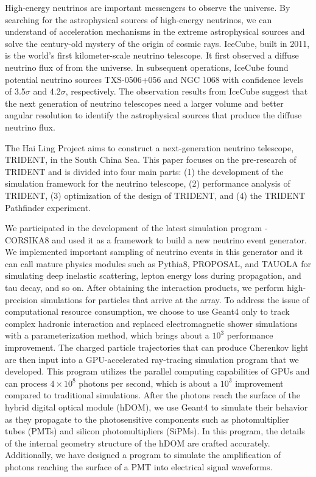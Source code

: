 \begin{eabstract}

High-energy neutrinos are important messengers to observe the universe. By searching for the astrophysical sources of high-energy neutrinos, we can understand of acceleration mechanisms in the extreme astrophysical sources and solve the century-old mystery of the origin of cosmic rays.
IceCube, built in 2011, is the world's first kilometer-scale neutrino telescope. It first observed a diffuse neutrino flux of from the universe. In subsequent operations, IceCube found potential neutrino sources TXS-0506+056 and NGC 1068 with confidence levels of 3.5$\sigma$ and 4.2$\sigma$, respectively.
The observation results from IceCube suggest that the next generation of neutrino telescopes need a larger volume and better angular resolution to identify the astrophysical sources that produce the diffuse neutrino flux.

The Hai Ling Project aims to construct a next-generation neutrino telescope, TRIDENT, in the South China Sea. This paper focuses on the pre-research of TRIDENT and is divided into four main parts: (1) the development of the simulation framework for the neutrino telescope, (2) performance analysis of TRIDENT, (3) optimization of the design of TRIDENT, and (4) the TRIDENT Pathfinder experiment.

We participated in the development of the latest simulation program - CORSIKA8 and used it as a framework to build a new neutrino event generator. We implemented important sampling of neutrino events in this generator and it can call mature physics modules such as Pythia8, PROPOSAL, and TAUOLA for simulating deep inelastic scattering, lepton energy loss during propagation, and tau decay, and so on.
After obtaining the interaction products, we perform high-precision simulations for particles that arrive at the array. To address the issue of computational resource consumption, we choose to use Geant4 only to track complex hadronic interaction and replaced electromagnetic shower simulations with a parameterization method, which brings about a $10^3$ performance improvement.
The charged particle trajectories that can produce Cherenkov light are then input into a GPU-accelerated ray-tracing simulation program that we developed. This program utilizes the parallel computing capabilities of GPUs and can process $4 \times 10^8$ photons per second, which is about a $10^3$ improvement compared to traditional simulations.
After the photons reach the surface of the hybrid digital optical module (hDOM), we use Geant4 to simulate their behavior as they propagate to the photosensitive components such as photomultiplier tubes (PMTs) and silicon photomultipliers (SiPMs). In this program, the details of the internal geometry structure of the hDOM are crafted accurately.
Additionally, we have designed a program to simulate the amplification of photons reaching the surface of a PMT into electrical signal waveforms.


\end{eabstract}
